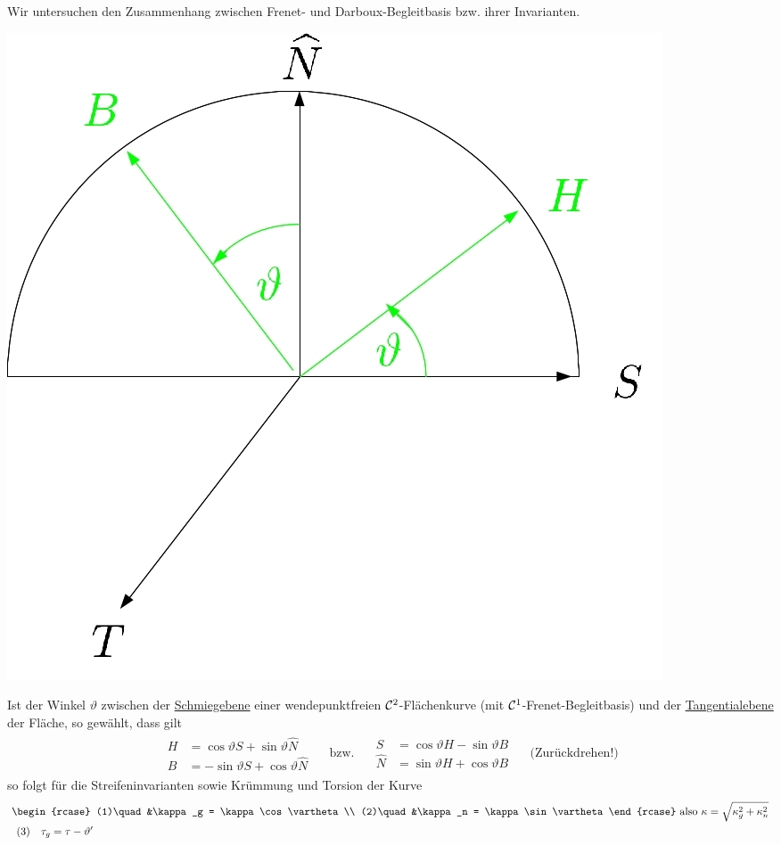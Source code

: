 Wir untersuchen den Zusammenhang zwischen Frenet- und Darboux-Begleitbasis bzw. ihrer Invarianten. 
\begin{center}
\includegraphics[scale=0.2]{Bilder/Bsp14.jpg} 
\end{center}
\begin{satz}\label{satz243}
 Ist der Winkel \(\vartheta\) zwischen der \uline{Schmiegebene} einer wendepunktfreien \(\mathcal{C}^2\)-Flächenkurve (mit \(\mathcal{C}^1\)-Frenet-Begleitbasis) und der \uline{Tangentialebene} der Fläche, so gewählt, dass gilt
 \begin{align*}
  \begin{matrix}
  H &= \cos \vartheta S + \sin \vartheta \widehat N \\
  B &= -\sin \vartheta S + \cos \vartheta \widehat N
  \end{matrix}
  \quad\text{ bzw. }\quad
  \begin{matrix}
   S &= \cos \vartheta H - \sin \vartheta B \\
   \widehat N &= \sin \vartheta H + \cos \vartheta B
  \end{matrix}
  \quad \text{ (Zurückdrehen!)}
 \end{align*}
 so folgt für die Streifeninvarianten sowie Krümmung und Torsion der Kurve
 \begin{align*}
  &\begin{rcase}
   (1)\quad &\kappa_g = \kappa \cos \vartheta \\
   (2)\quad &\kappa_n = \kappa \sin \vartheta
  \end{rcase}
  \text{ also } \kappa = \sqrt{\kappa_g^2 + \kappa_n^2} \\
  &\;\,(3) \quad \tau_g = \tau - \vartheta' 
 \end{align*}
\end{satz}

